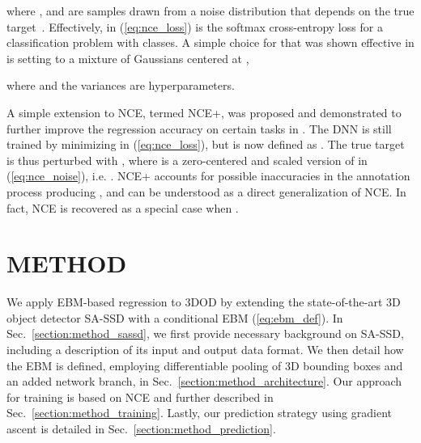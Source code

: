 \documentclass[letterpaper, 10 pt, conference]{ieeeconf}
\begin{document}
where , and  are  samples drawn from a noise distribution  that depends on the true target~. Effectively,  in (\ref{eq:nce_loss}) is the softmax cross-entropy loss for a classification problem with  classes. A simple choice for  that was shown effective in \cite{gustafsson2020train} is setting  to a mixture of  Gaussians centered at , 

where  and the variances  are hyperparameters.

A simple extension to NCE, termed NCE+, was proposed and demonstrated to further improve the regression accuracy on certain tasks in \cite{gustafsson2020train}. The DNN  is still trained by minimizing  in (\ref{eq:nce_loss}), but  is now defined as . The true target  is thus perturbed with , where  is a zero-centered and scaled version of  in (\ref{eq:nce_noise}), i.e. . NCE+ accounts for possible inaccuracies in the annotation process producing , and can be understood as a direct generalization of NCE. In fact, NCE is recovered as a special case when .









 \section{METHOD}
\label{section:method}





We apply EBM-based regression to 3DOD by extending the state-of-the-art 3D object detector SA-SSD \cite{he2020structure} with a conditional EBM  (\ref{eq:ebm_def}). In Sec.~\ref{section:method_sassd}, we first provide necessary background on SA-SSD, including a description of its input and output data format. We then detail how the EBM  is defined, employing differentiable pooling of 3D bounding boxes  and an added network branch, in Sec.~\ref{section:method_architecture}. Our approach for training  is based on NCE and further described in Sec.~\ref{section:method_training}. Lastly, our prediction strategy using gradient ascent is detailed in Sec.~\ref{section:method_prediction}.
\end{document}
